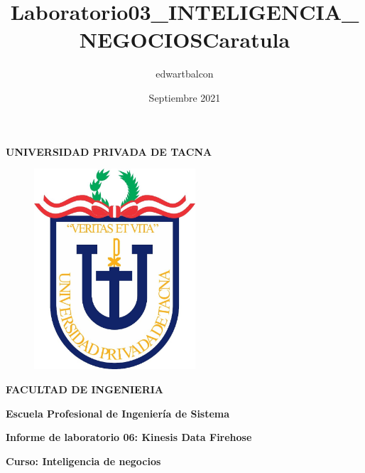 \documentclass{article}
\title{Laboratorio03_INTELIGENCIA_NEGOCIOS}
\author{edwartbalcon}
\date{Septiembre 2021}
\begin{document}
\title{Caratula}

\begin{titlepage}
\begin{center}
\begin{Large}
\textbf{UNIVERSIDAD PRIVADA DE TACNA} \\
\end{Large}
\vspace*{-0.025in}
\begin{figure}[htb]
\begin{center}
\includegraphics[width=6cm]{./images/logo_UPT}
\end{center}
\end{figure}
\vspace*{-0.025in}
\begin{Large}
\textbf{FACULTAD DE INGENIERIA} \\
\end{Large}
\vspace*{0.05in}
\begin{Large}
\textbf{Escuela Profesional de Ingeniería de Sistema} \\
\end{Large}


\vspace*{0.4in}

\vspace*{0.1in}
\begin{Large}
\textbf{Informe de laboratorio 06: Kinesis Data Firehose} \\
\end{Large}

\vspace*{0.3in}
\begin{Large}
\textbf{Curso: Inteligencia de negocios} \\
\end{Large}


\end{center}
\end{titlepage}
\end{document}
